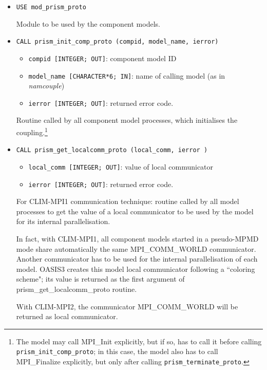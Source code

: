 \begin{itemize}

\item {\tt USE mod\_prism\_proto}
 
Module to be used by the component models. 

\item {\tt CALL prism\_init\_comp\_proto (compid, model\_name, ierror)} 

 \begin{itemize}
   \item {\tt compid [INTEGER; OUT]}: component model ID 
   \item {\tt model\_name [CHARACTER*6; IN]}: name of calling model (as in
  {\em namcouple}) 
   \item {\tt ierror [INTEGER; OUT]}: returned error code.
 \end{itemize}
 
Routine called by all component model processes, which initialises the
coupling.\footnote{The model may call MPI\_Init explicitly, but if so, has to
call it before calling {\tt prism\_init\_comp\_proto}; in this case, the
model also has to call MPI\_Finalize explicitly, but only after calling
{\tt prism\_terminate\_proto}.}

\item {\tt CALL prism\_get\_localcomm\_proto (local\_comm, ierror )}

 \begin{itemize}
   \item {\tt local\_comm [INTEGER; OUT]}: value of local communicator
   \item {\tt ierror [INTEGER; OUT]}: returned error code.
  \end{itemize}

  For CLIM-MPI1 communication technique: routine called by all model
  processes to get the value of a local communicator to be used by the
  model for its internal parallelisation.

  In fact, with CLIM-MPI1, all component models started in a
  pseudo-MPMD mode share automatically the same MPI\_COMM\_WORLD
  communicator.  Another communicator has to be used for the internal
  parallelisation of each model. OASIS3 creates this model local
  communicator following a ``coloring scheme"; its value is returned
  as the first argument of prism\_get\_localcomm\_proto routine.

  With CLIM-MPI2, the communicator MPI\_COMM\_WORLD will be returned as
  local communicator.


\end{itemize}

